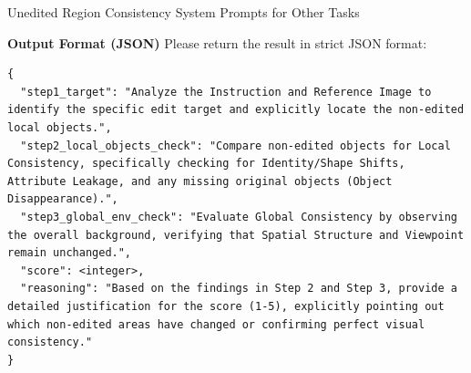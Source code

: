 \begin{promptbox}[label={System Prompts: URC_Other_Tasks}]{Unedited Region Consistency System Prompts for Other Tasks}
\medskip

\textbf{Output Format (JSON)}
Please return the result in strict JSON format:

\begin{lstlisting}
{
  "step1_target": "Analyze the Instruction and Reference Image to identify the specific edit target and explicitly locate the non-edited local objects.",
  "step2_local_objects_check": "Compare non-edited objects for Local Consistency, specifically checking for Identity/Shape Shifts, Attribute Leakage, and any missing original objects (Object Disappearance).",
  "step3_global_env_check": "Evaluate Global Consistency by observing the overall background, verifying that Spatial Structure and Viewpoint remain unchanged.",
  "score": <integer>,
  "reasoning": "Based on the findings in Step 2 and Step 3, provide a detailed justification for the score (1-5), explicitly pointing out which non-edited areas have changed or confirming perfect visual consistency."
}
\end{lstlisting}

\end{promptbox}

\clearpage

